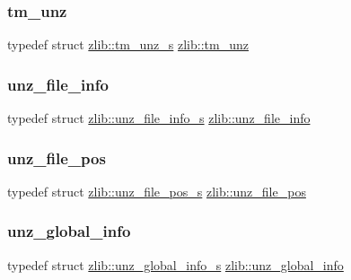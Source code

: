 \mbox{\label{namespacezlib_a98fa3246f3d786aca4a6def1a4c380ab}} 
\subsubsection{\texorpdfstring{tm\+\_\+unz}{tm\_unz}}
{\footnotesize\ttfamily typedef struct \hyperlink{structzlib_1_1tm__unz__s}{zlib\+::tm\+\_\+unz\+\_\+s}  \hyperlink{namespacezlib_a98fa3246f3d786aca4a6def1a4c380ab}{zlib\+::tm\+\_\+unz}}

\mbox{\label{namespacezlib_aaf9fc35879a68a5fe0b6a5113bd271b5}} 
\subsubsection{\texorpdfstring{unz\+\_\+file\+\_\+info}{unz\_file\_info}}
{\footnotesize\ttfamily typedef struct \hyperlink{structzlib_1_1unz__file__info__s}{zlib\+::unz\+\_\+file\+\_\+info\+\_\+s}  \hyperlink{namespacezlib_aaf9fc35879a68a5fe0b6a5113bd271b5}{zlib\+::unz\+\_\+file\+\_\+info}}

\mbox{\label{namespacezlib_aafe5edb16e400a11811c203048d2f464}} 
\subsubsection{\texorpdfstring{unz\+\_\+file\+\_\+pos}{unz\_file\_pos}}
{\footnotesize\ttfamily typedef struct \hyperlink{structzlib_1_1unz__file__pos__s}{zlib\+::unz\+\_\+file\+\_\+pos\+\_\+s}  \hyperlink{namespacezlib_aafe5edb16e400a11811c203048d2f464}{zlib\+::unz\+\_\+file\+\_\+pos}}

\mbox{\label{namespacezlib_a720c995c51babbb6d5cbf3e022a4c7b4}} 
\subsubsection{\texorpdfstring{unz\+\_\+global\+\_\+info}{unz\_global\_info}}
{\footnotesize\ttfamily typedef struct \hyperlink{structzlib_1_1unz__global__info__s}{zlib\+::unz\+\_\+global\+\_\+info\+\_\+s}  \hyperlink{namespacezlib_a720c995c51babbb6d5cbf3e022a4c7b4}{zlib\+::unz\+\_\+global\+\_\+info}}

